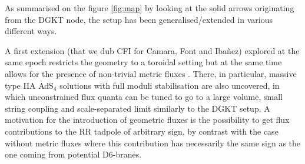 \documentclass[11pt, a4paper]{article}
\begin{document}
As summarised on the figure \ref{fig:map} by looking at the solid arrows originating from the DGKT node, the setup has been generalised/extended in various different ways.

A first extension (that we dub CFI for Camara, Font and Ibañez) explored at the same epoch restricts the geometry to a toroidal setting but at the same time allows for the presence of non-trivial metric fluxes  \cite{Camara:2005dc,Derendinger:2004jn,Villadoro:2005cu}. There, in particular, massive type IIA AdS$_4$ solutions with full moduli stabilisation are also uncovered, in which unconstrained flux quanta can be tuned to go to a large volume, small string coupling and scale-separated limit similarly to the DGKT setup. A motivation for the introduction of geometric fluxes is the possibility to get flux contributions to the RR tadpole of arbitrary sign, by contrast with the case without metric fluxes where this contribution has necessarily the same sign as the one coming from potential D6-branes.
\end{document}
